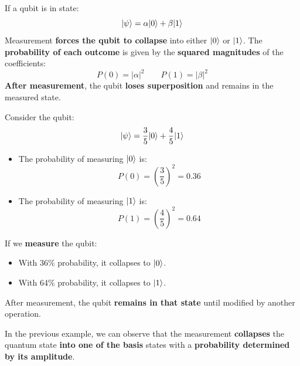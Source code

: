 \highspace
If a qubit is in state:
\begin{equation*}
    | \psi \rangle = \alpha | 0 \rangle + \beta | 1 \rangle
\end{equation*}
Measurement \textbf{forces the qubit to collapse} into either $| 0 \rangle$ or $| 1 \rangle$. The \textbf{probability of each outcome} is given by the \textbf{squared magnitudes} of the coefficients:
\begin{equation*}
    P\left(0\right) = \left|\alpha\right|^{2} \hspace{2em} P\left(1\right) = \left|\beta\right|^{2}
\end{equation*}
\textbf{After measurement}, the qubit \textbf{loses superposition} and remains in the measured state.

\highspace
\begin{examplebox}
    Consider the qubit:
    \begin{equation*}
        | \psi \rangle = \dfrac{3}{5}| 0 \rangle + \dfrac{4}{5}| 1 \rangle
    \end{equation*}
    \begin{itemize}
        \item The probability of measuring $| 0 \rangle$ is:
        \begin{equation*}
            P\left(0\right) = \left(\dfrac{3}{5}\right)^{2} = 0.36
        \end{equation*}
        \item The probability of measuring $| 1 \rangle$ is:
        \begin{equation*}
            P\left(1\right) = \left(\dfrac{4}{5}\right)^{2} = 0.64
        \end{equation*}
    \end{itemize}
    If we \textbf{measure} the qubit:
    \begin{itemize}
        \item With 36\% probability, it collapses to $| 0 \rangle$.
        \item With 64\% probability, it collapses to $| 1 \rangle$.
    \end{itemize}
    After measurement, the qubit \textbf{remains in that state} until modified by another operation.
\end{examplebox}

\noindent
In the previous example, we can observe that the measurement \textbf{collapses} the quantum state \textbf{into one of the basis} states with a \textbf{probability determined by its amplitude}.

